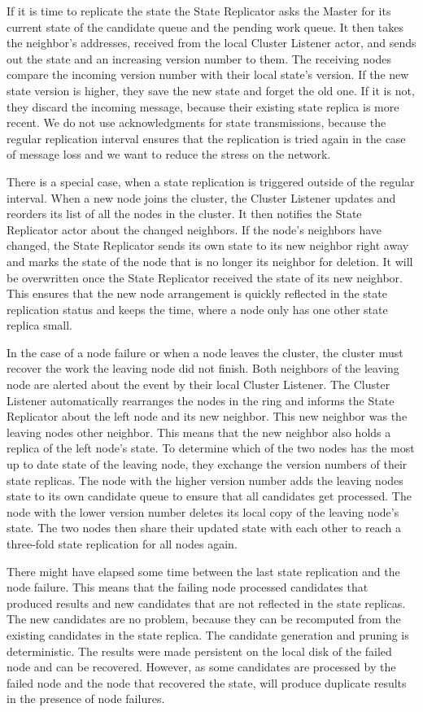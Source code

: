   If it is time to replicate the state the State Replicator asks the Master for its current state of the candidate queue and the pending work queue.
  It then takes the neighbor's addresses, received from the local Cluster Listener actor, and sends out the state and an increasing version number to them.
  The receiving nodes compare the incoming version number with their local state's version.
  If the new state version is higher, they save the new state and forget the old one.
  If it is not, they discard the incoming message, because their existing state replica is more recent.
  We do not use acknowledgments for state transmissions, because the regular replication interval ensures that the replication is tried again in the case of message loss and we want to reduce the stress on the network.

  There is a special case, when a state replication is triggered outside of the regular interval.
  When a new node joins the cluster, the Cluster Listener updates and reorders its list of all the nodes in the cluster.
  It then notifies the State Replicator actor about the changed neighbors.
  If the node's neighbors have changed, the State Replicator sends its own state to its new neighbor right away and marks the state of the node that is no longer its neighbor for deletion.
  It will be overwritten once the State Replicator received the state of its new neighbor.
  This ensures that the new node arrangement is quickly reflected in the state replication status and keeps the time, where a node only has one other state replica small.

  In the case of a node failure or when a node leaves the cluster, the cluster must recover the work the leaving node did not finish.
  Both neighbors of the leaving node are alerted about the event by their local Cluster Listener.
  The Cluster Listener automatically rearranges the nodes in the ring and informs the State Replicator about the left node and its new neighbor.
  This new neighbor was the leaving nodes other neighbor.
  This means that the new neighbor also holds a replica of the left node's state.
  To determine which of the two nodes has the most up to date state of the leaving node, they exchange the version numbers of their state replicas.
  The node with the higher version number adds the leaving nodes state to its own candidate queue to ensure that all candidates get processed.
  The node with the lower version number deletes its local copy of the leaving node's state.
  The two nodes then share their updated state with each other to reach a three-fold state replication for all nodes again.

  There might have elapsed some time between the last state replication and the node failure.
  This means that the failing node processed candidates that produced results and new candidates that are not reflected in the state replicas.
  The new candidates are no problem, because they can be recomputed from the existing candidates in the state replica.
  The candidate generation and pruning is deterministic.
  The results were made persistent on the local disk of the failed node and can be recovered.
  However, as some candidates are processed by the failed node and the node that recovered the state, \dodo{} will produce duplicate results in the presence of node failures.
